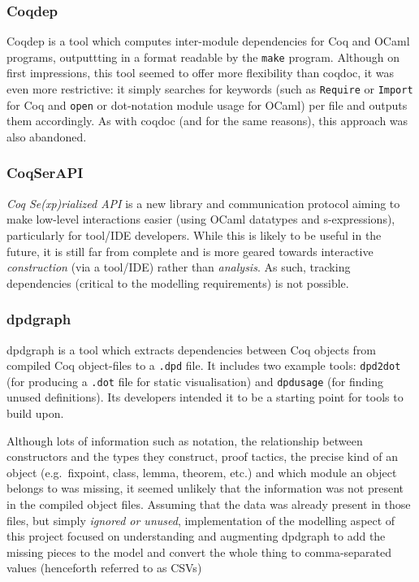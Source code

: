 \subsubsection{Coqdep}
Coqdep is a tool which computes inter-module dependencies for Coq and
OCaml programs, outputtting in a format readable by the \texttt{make} program.
Although on first impressions, this tool seemed to offer more flexibility than
coqdoc, it was even more restrictive: it simply searches for keywords (such as
\texttt{Require} or \texttt{Import} for Coq  and \texttt{open} or dot-notation
module usage for OCaml) per file and outputs them accordingly.  As with coqdoc
(and for the same reasons), this approach was also abandoned.

\subsubsection{CoqSerAPI}

\emph{Coq Se(xp)rialized API} is a new library and communication protocol aiming to
make low-level interactions easier (using OCaml datatypes and s-expressions),
particularly for tool/IDE developers. While this is likely to be useful in the
future, it is still far from complete and is more geared towards interactive
\emph{construction} (via a tool/IDE) rather than \emph{analysis}. As such,
tracking dependencies (critical to the modelling requirements) is not possible.

\subsubsection{dpdgraph}

dpdgraph is a tool which extracts dependencies between Coq objects from compiled
Coq object-files to a \texttt{.dpd} file. It includes two example tools:
\texttt{dpd2dot} (for producing a \texttt{.dot} file for static visualisation)
and \texttt{dpdusage} (for finding unused definitions). Its developers intended
it to be a starting point for tools to build upon.

Although lots of information such as notation, the relationship between
constructors and the types they construct, proof tactics, the precise kind of an
object (e.g.\  fixpoint, class, lemma, theorem, etc.) and which module an object
belongs to was missing, it seemed unlikely that the information was not present
in the compiled object files. Assuming that the data was already present in
those files, but simply \emph{ignored or unused}, implementation of the
modelling aspect of this project focused on understanding and augmenting
dpdgraph to add the missing pieces to the model and convert the whole thing to
comma-separated values (henceforth referred to as CSVs)

